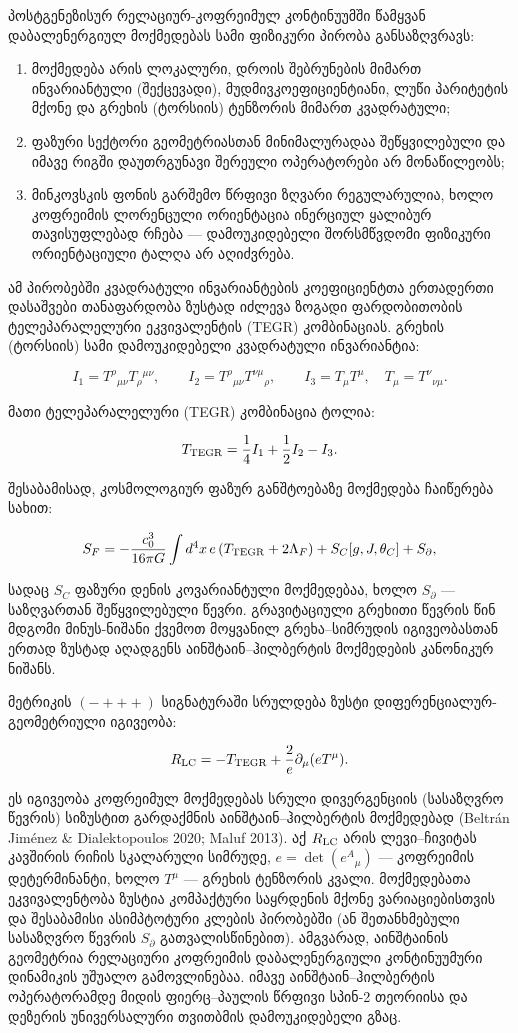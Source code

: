 \documentclass[11pt,a4paper]{article}
\begin{document}
პოსტგენეზისურ რელაციურ-კოფრეიმულ კონტინუუმში წამყვან დაბალენერგიულ მოქმედებას სამი ფიზიკური პირობა განსაზღვრავს:

\begin{enumerate}[label=\arabic*.]
\item მოქმედება არის ლოკალური, დროის შებრუნების მიმართ ინვარიანტული (შექცევადი), მუდმივკოეფიციენტიანი, ლუწი პარიტეტის მქონე და გრეხის (ტორსიის) ტენზორის მიმართ კვადრატული;
\item ფაზური სექტორი გეომეტრიასთან მინიმალურადაა შეწყვილებული და იმავე რიგში დაუთრგუნავი შერეული ოპერატორები არ მონაწილეობს;
\item მინკოვსკის ფონის გარშემო წრფივი ზღვარი რეგულარულია, ხოლო კოფრეიმის ლორენცული ორიენტაცია ინერციულ ყალიბურ თავისუფლებად რჩება — დამოუკიდებელი შორსმწვდომი ფიზიკური ორიენტაციული ტალღა არ აღიძვრება.

\end{enumerate}
ამ პირობებში კვადრატული ინვარიანტების კოეფიციენტთა ერთადერთი დასაშვები თანაფარდობა ზუსტად იძლევა ზოგადი ფარდობითობის ტელეპარალელური ეკვივალენტის (TEGR) კომბინაციას. გრეხის (ტორსიის) სამი დამოუკიდებელი კვადრატული ინვარიანტია:

\[
I_1=T^\rho{}_{\mu\nu}T_\rho{}^{\mu\nu},\qquad
I_2=T^\rho{}_{\mu\nu}T^{\nu\mu}{}_\rho,\qquad
I_3=T_\mu T^\mu,\quad T_\mu=T^\nu{}_{\nu\mu}.
\]

მათი ტელეპარალელური (TEGR) კომბინაცია ტოლია:

\[
T_{\rm TEGR}=\frac14 I_1+\frac12 I_2-I_3.
\]

შესაბამისად, კოსმოლოგიურ ფაზურ განშტოებაზე მოქმედება ჩაიწერება სახით:

\[
S_F=-\frac{c_0^3}{16\pi G}\int d^4x\,e\left(T_{\rm TEGR}+2\Lambda_F\right)
+S_C[g,J,\theta_C]+S_{\partial},
\]

სადაც $S_C$ ფაზური დენის კოვარიანტული მოქმედებაა, ხოლო $S_{\partial}$ — საზღვართან შეწყვილებული წევრი. გრავიტაციული გრეხითი წევრის წინ მდგომი მინუს-ნიშანი ქვემოთ მოყვანილ გრეხა–სიმრუდის იგივეობასთან ერთად ზუსტად აღადგენს აინშტაინ–ჰილბერტის მოქმედების კანონიკურ ნიშანს.

მეტრიკის $(-+++)$ სიგნატურაში სრულდება ზუსტი დიფერენციალურ-გეომეტრიული იგივეობა:

\[
R_{\rm LC}=-T_{\rm TEGR}+\frac{2}{e}\partial_\mu(eT^\mu).
\]

ეს იგივეობა კოფრეიმულ მოქმედებას სრული დივერგენციის (სასაზღვრო წევრის) სიზუსტით გარდაქმნის აინშტაინ–ჰილბერტის მოქმედებად (Beltrán Jiménez \& Dialektopoulos 2020; Maluf 2013). აქ $R_{\rm LC}$ არის ლევი–ჩივიტას კავშირის რიჩის სკალარული სიმრუდე, $e=\det(e^A{}_\mu)$ — კოფრეიმის დეტერმინანტი, ხოლო $T^\mu$ — გრეხის ტენზორის კვალი. მოქმედებათა ეკვივალენტობა ზუსტია კომპაქტური საყრდენის მქონე ვარიაციებისთვის და შესაბამისი ასიმპტოტური კლების პირობებში (ან შეთანხმებული სასაზღვრო წევრის $S_\partial$ გათვალისწინებით). ამგვარად, აინშტაინის გეომეტრია რელაციური კოფრეიმის დაბალენერგიული კონტინუუმური დინამიკის უშუალო გამოვლინებაა. იმავე აინშტაინ–ჰილბერტის ოპერატორამდე მიდის ფიერც–პაულის წრფივი სპინ-2 თეორიისა და დეზერის უნივერსალური თვითბმის დამოუკიდებელი გზაც.
\end{document}
